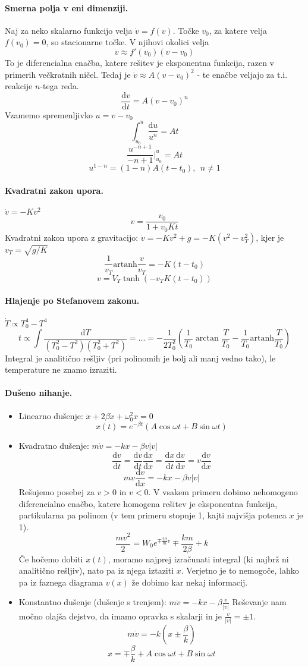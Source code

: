 \documentclass[a4paper]{article}
\newcommand{\dif}{\mathrm{d}}
\newcommand{\dd}[2]{\frac{\mathrm{d} {#1}}{\mathrm{d} {#2}}}
\begin{document}
\paragraph{Smerna polja v eni dimenziji.} Naj za neko skalarno funkcijo velja $\dot{v} = f(v)$. Točke $v_0$, za katere velja $f(v_0) = 0$, so stacionarne točke.
V njihovi okolici velja $$\dot{v} \approx f'(v_0)(v-v_0)$$
To je diferencialna enačba, katere rešitev je eksponentna funkcija, razen v primerih večkratnih ničel.
Tedaj je $\dot v \approx A(v-v_0)^2$ - te enačbe veljajo za t.i. reakcije $n$-tega reda.
$$\dd{v}{t} = A(v-v_0)^n$$
Vzamemo spremenljivko $u = v-v_0$
$$\int_{u_0}^{u} \frac{\dif u}{u^n} = At$$
$$\frac{u^{-n+1}}{-n+1}\Big|_{u_0}^{u} = At$$
$$u^{1-n} = (1-n)A(t-t_0), ~~n \neq 1$$
\paragraph{Kvadratni zakon upora.} $\dot v = -Kv^2$
$$v = \frac{v_0}{1+v_0Kt}$$
Kvadratni zakon upora z gravitacijo: $\dot v = -Kv^2 + g = -K(v^2 - v_T^2)$, kjer je $v_T = \sqrt{g/K}$
$$\frac{1}{v_T}\mathrm{artanh}\frac{v}{v_T} = -K(t-t_0)$$
$$v = V_T\tanh(-v_TK(t-t_0))$$
\paragraph{Hlajenje po Stefanovem zakonu.} $\dot T \propto T_0^4 - T^4$
$$t \propto \int \frac{\dif T}{(T_0^2 - T^2)(T_0^2 + T^2)} = ... = -\frac{1}{2T_0^2}\left(\frac{1}{T_0}\arctan\frac{T}{T_0} - \frac{1}{T_0}\mathrm{artanh}\frac{T}{T_0}\right)$$
Integral je analitično rešljiv (pri polinomih je bolj ali manj vedno tako), le temperature ne znamo izraziti.
\paragraph{Dušeno nihanje.}\begin{itemize}
    \item Linearno dušenje: $\ddot{x} + 2\beta\dot{x} + \omega_0^2x = 0$ $$x(t) = e^{-\beta t} \left(A\cos\omega t + B\sin\omega t\right)$$
    \item Kvadratno dušenje: $m\dot v = -kx - \beta v|v|$
    $$\dd{v}{t} = \dd{v}{t}\dd{x}{x} = \dd{x}{t}\dd{v}{x} = v\dd{v}{x}$$
    $$mv\dd{v}{x} = -kx - \beta v|v|$$
    Rešujemo posebej za $v > 0$ in $v < 0$. V vsakem primeru dobimo nehomogeno diferencialno enačbo, katere homogena rešitev
    je eksponentna funkcija, partikularna pa polinom (v tem primeru stopnje 1, kajti najvišja potenca $x$ je 1).
    $$\frac{mv^2}{2} = W_0e^{\mp \frac{2\beta}{m}v}\mp\frac{km}{2\beta} + k$$
    Če hočemo dobiti $x(t)$, moramo najprej izračunati integral (ki najbrž ni analitično rešljiv), nato pa iz njega iztaziti $x$. Verjetno je to nemogoče,
    lahko pa iz faznega diagrama $v(x)$ že dobimo kar nekaj informacij.
    \item Konstantno dušenje (dušenje s trenjem): $m\dot v = -kx - \beta\frac{v}{|v|}$
    Reševanje nam močno olajša dejstvo, da imamo opravka s skalarji in je $\displaystyle{\frac{v}{|v|} = \pm 1}$.
    $$m\dot v = -k\left(x\pm \frac{\beta}{k}\right)$$
    $$x = \mp \frac{\beta}{k} + A\cos\omega t + B\sin\omega t$$
\end{itemize}
\end{document}
